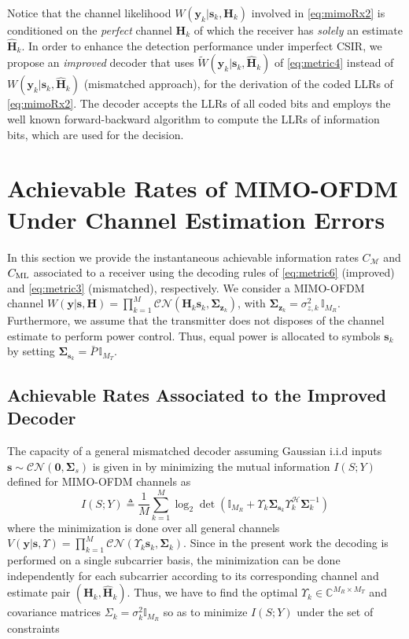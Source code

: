 \documentclass{article}
\def\W{,\thickspace}
\def\H{{\mathbf H}}
\def\HH{\widehat{{\mathbf H}}}
\def\tg{\mathcal{H}}
\def\y{{\bm y }}
\def\s{{\bm s }}
\def\z{{\bm z }}
\def\W{{ W}}
\def\WT{{\widetilde{ W}}}
\def\eye{{\mathbb I}}
\def\sig{\mathbf \Sigma}
\newcommand{\mc}{\mathcal}
\begin{document}
Notice that the channel likelihood $\W(\y_k|\s_k,\H_k)$ involved in \eqref{eq:mimoRx2} is conditioned on the {\it perfect} channel $\H_k$ of which the receiver has {\it solely} an estimate $\HH_k$.
In order to enhance the detection performance under imperfect CSIR, we propose an {\it improved} decoder that uses $\WT(\y_k|\s_k,\HH_k)$ of \eqref{eq:metric4} instead of $\W(\y_k|\s_k,\HH_k)$ (mismatched approach), for the derivation of the coded LLRs of \eqref{eq:mimoRx2}. The decoder accepts the LLRs
of all coded bits and employs the well known forward-backward algorithm \cite{bcjr} to compute the LLRs of information bits, which are used for the decision.
\vspace{-3mm}
\section{Achievable Rates of MIMO-OFDM Under Channel Estimation Errors}
\label{sec:cap}
In this section we provide the instantaneous achievable information rates $C_{\mathcal{M}}$ and $C_{\rm ML}$ associated to a receiver using the decoding rules of \eqref{eq:metric6} (improved) and \eqref{eq:metric3} (mismatched), respectively. We consider a MIMO-OFDM channel $W(\y|\s,\H)=\prod_{k=1}^M \mc{CN}(\H_k \s_k,\sig_{\z_k})$, with $\sig_{\z_k}=\sigma^2_{z,k}\,\eye_{M_R}$. Furthermore, we assume that the transmitter does not disposes of the channel estimate to perform power control. Thus, equal power is allocated to symbols $\s_k$ by setting $\sig_{\s_k}=\bar{P}\, \eye_{M_T}$.
\subsection{Achievable Rates Associated to the Improved Decoder }
The capacity of a general mismatched decoder assuming Gaussian i.i.d inputs $\s \sim \mc{CN}(\mathbf{0},\sig_s)$ is given in \cite{merhav94} by minimizing the mutual information $I(S;Y)$ defined for MIMO-OFDM channels as \cite{bolskei02}
\begin{equation}
\label{mutinf}
I(S;Y)\triangleq \frac{1}{M} \sum_{k=1}^M \log_2 \det \left(\eye_{M_R}+ \Upsilon_k \sig_{\s_k} \Upsilon_k^{\tg}\sig_k^{-1} \right)
\end{equation}
where the minimization is done over all general channels $V(\y|\s,\Upsilon)=\prod_{k=1}^M \mc{CN}(\Upsilon_k \s_k,\sig_k)$.
Since in the present work the decoding is performed on a single subcarrier basis, the minimization can be done independently for each subcarrier according to its corresponding channel and estimate pair $(\H_k,\HH_k)$.
Thus, we have to find the optimal $\Upsilon_k\in \mathbb{C}^{M_R\times M_T}$ and covariance matrices $\Sigma_k = \sigma^2_k\mathbb{I}_{M_R}$ so as to minimize $I(S;Y)$ under the set of constraints \cite{merhav94} \vspace{2mm}
\end{document}
